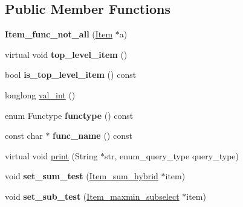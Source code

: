 \subsection*{Public Member Functions}
\begin{DoxyCompactItemize}
\item 
\mbox{\label{classItem__func__not__all_af5fd71ef3ad03e62d4b2d27d2c677c63}} 
{\bfseries Item\+\_\+func\+\_\+not\+\_\+all} (\mbox{\hyperlink{classItem}{Item}} $\ast$a)
\item 
\mbox{\label{classItem__func__not__all_a552a43f8c2403fbc38355625cfd30ccb}} 
virtual void {\bfseries top\+\_\+level\+\_\+item} ()
\item 
\mbox{\label{classItem__func__not__all_aa78516c4d35ffb6c266b8c977fe23eca}} 
bool {\bfseries is\+\_\+top\+\_\+level\+\_\+item} () const
\item 
longlong \mbox{\hyperlink{classItem__func__not__all_a8c295f113fceeb1d2f97cf12b0414a40}{val\+\_\+int}} ()
\item 
\mbox{\label{classItem__func__not__all_a5273783f41d35d8295590724f0fc2d4d}} 
enum Functype {\bfseries functype} () const
\item 
\mbox{\label{classItem__func__not__all_a42bb0053e8a6016c85129bca319ae85d}} 
const char $\ast$ {\bfseries func\+\_\+name} () const
\item 
virtual void \mbox{\hyperlink{classItem__func__not__all_add67ca3249a9c4b6b68e6a6d0fcdd411}{print}} (String $\ast$str, enum\+\_\+query\+\_\+type query\+\_\+type)
\item 
\mbox{\label{classItem__func__not__all_a634446d13213c407074d4adc30a8a9be}} 
void {\bfseries set\+\_\+sum\+\_\+test} (\mbox{\hyperlink{classItem__sum__hybrid}{Item\+\_\+sum\+\_\+hybrid}} $\ast$item)
\item 
\mbox{\label{classItem__func__not__all_ac2ee5938ea97c5a2e37eedb6956f2d5c}} 
void {\bfseries set\+\_\+sub\+\_\+test} (\mbox{\hyperlink{classItem__maxmin__subselect}{Item\+\_\+maxmin\+\_\+subselect}} $\ast$item)
\item 

\end{DoxyCompactItemize}
